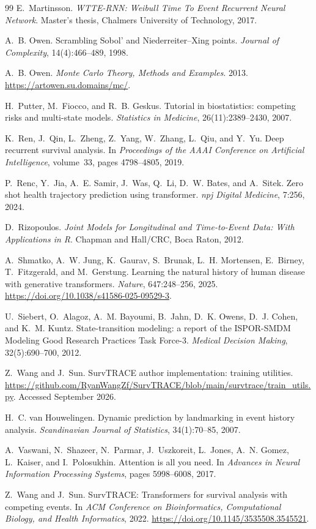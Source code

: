 \begin{thebibliography}{99}
E.~Martinsson.
\emph{WTTE-RNN: Weibull Time To Event Recurrent Neural Network}.
Master's thesis, Chalmers University of Technology, 2017.

A.~B. Owen.
Scrambling Sobol' and Niederreiter--Xing points.
\emph{Journal of Complexity}, 14(4):466--489, 1998.

A.~B. Owen.
\emph{Monte Carlo Theory, Methods and Examples}.
2013. \url{https://artowen.su.domains/mc/}.

H.~Putter, M.~Fiocco, and R.~B. Geskus.
Tutorial in biostatistics: competing risks and multi-state models.
\emph{Statistics in Medicine}, 26(11):2389--2430, 2007.

K.~Ren, J.~Qin, L.~Zheng, Z.~Yang, W.~Zhang, L.~Qiu, and Y.~Yu.
Deep recurrent survival analysis.
In \emph{Proceedings of the AAAI Conference on Artificial Intelligence},
volume~33, pages 4798--4805, 2019.

P.~Renc, Y.~Jia, A.~E. Samir, J.~Was, Q.~Li, D.~W. Bates, and A.~Sitek.
Zero shot health trajectory prediction using transformer.
\emph{npj Digital Medicine}, 7:256, 2024.

D.~Rizopoulos.
\emph{Joint Models for Longitudinal and Time-to-Event Data: With Applications in R}.
Chapman and Hall/CRC, Boca Raton, 2012.

A.~Shmatko, A.~W. Jung, K.~Gaurav, S.~Brunak, L.~H. Mortensen, E.~Birney, T.~Fitzgerald, and M.~Gerstung.
Learning the natural history of human disease with generative transformers.
\emph{Nature}, 647:248--256, 2025. \url{https://doi.org/10.1038/s41586-025-09529-3}.

U.~Siebert, O.~Alagoz, A.~M. Bayoumi, B.~Jahn, D.~K. Owens, D.~J. Cohen, and K.~M. Kuntz.
State-transition modeling: a report of the ISPOR-SMDM Modeling Good Research Practices Task Force-3.
\emph{Medical Decision Making}, 32(5):690--700, 2012.

Z.~Wang and J.~Sun. SurvTRACE author implementation: training utilities.
\url{https://github.com/RyanWangZf/SurvTRACE/blob/main/survtrace/train_utils.py}.
Accessed September 2026.

H.~C. van Houwelingen.
Dynamic prediction by landmarking in event history analysis.
\emph{Scandinavian Journal of Statistics}, 34(1):70--85, 2007.

A.~Vaswani, N.~Shazeer, N.~Parmar, J.~Uszkoreit, L.~Jones, A.~N. Gomez,
L.~Kaiser, and I.~Polosukhin.
Attention is all you need.
In \emph{Advances in Neural Information Processing Systems}, pages 5998--6008,
2017.

Z.~Wang and J.~Sun.
SurvTRACE: Transformers for survival analysis with competing events.
In \emph{ACM Conference on Bioinformatics, Computational Biology, and Health Informatics}, 2022.
\url{https://doi.org/10.1145/3535508.3545521}.
\end{thebibliography}
